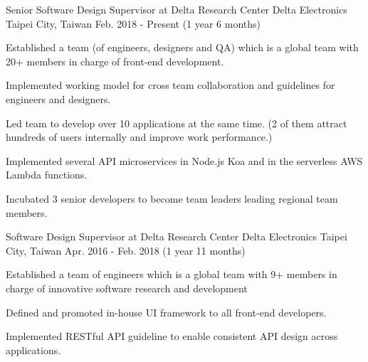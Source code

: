 

\begin{cventries}

  \cventry
    {Senior Software Design Supervisor at Delta Research Center} %
    {Delta Electronics} %
    {Taipei City, Taiwan} %
    {Feb. 2018 - Present (1 year 6 months)} %
    {
      \begin{cvitems} %
        \item {Established a team (of engineers, designers and QA) which is a global team with 20+ members in charge of front-end development. }
        \item {Implemented working model for cross team collaboration and guidelines for engineers and designers.}
        \item {Led team to develop over 10 applications at the same time. (2 of them attract hundreds of users internally and improve work performance.)}
        \item {Implemented several API microservices in Node.js Koa and in the serverless AWS Lambda functions.}
        \item {Incubated 3 senior developers to become team leaders leading regional team members.}
      \end{cvitems}
    }

  \cventry
    {Software Design Supervisor at Delta Research Center} %
    {Delta Electronics} %
    {Taipei City, Taiwan} %
    {Apr. 2016 - Feb. 2018 (1 year 11 months)} %
    {
      \begin{cvitems} %
        \item {Established a team of engineers which is a global team with 9+ members in charge of innovative software research and development}
        \item {Defined and promoted in-house UI framework to all front-end developers.}
        \item {Implemented RESTful API guideline to enable consistent API design across applications.}
      \end{cvitems}
    }


\end{cventries}
